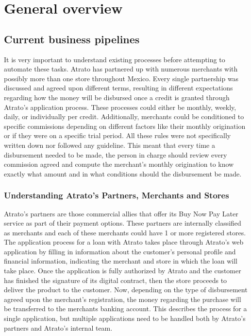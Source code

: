 \chapter{General overview}


\section{Current business pipelines}

It is very important to understand existing processes before attempting to automate these tasks. Atrato has partnered up with numerous merchants with possibly more than one store throughout Mexico. Every single partnership was discussed and agreed upon different terms, resulting in different expectations regarding how the money will be disbursed once a credit is granted through Atrato’s application process. These processes could either be monthly, weekly, daily, or individually per credit. Additionally, merchants could be conditioned to specific commissions depending on different factors like their monthly origination or if they were on a specific trial period. All these rules were not specifically written down nor followed any guideline. This meant that every time a disbursement needed to be made, the person in charge should review every commission agreed and compute the merchant’s monthly origination to know exactly what amount and in what conditions should the disbursement be made.

\subsection{Understanding Atrato’s Partners, Merchants and Stores}

Atrato’s partners are those commercial allies that offer its Buy Now Pay Later service as part of their payment options. These partners are internally classified as merchants and each of these merchants could have 1 or more registered stores.\\

The application process for a loan with Atrato takes place through Atrato’s web application by filling in information about the customer’s personal profile and financial information, indicating the merchant and store in which the loan will take place. Once the application is fully authorized by Atrato and the customer has finished the signature of its digital contract, then the store proceeds to deliver the product to the customer. Now, depending on the type of disbursement agreed upon the merchant’s registration, the money regarding the purchase will be transferred to the merchants banking account. This describes the process for a single application, but multiple applications need to be handled both by Atrato’s partners and Atrato’s internal team.

